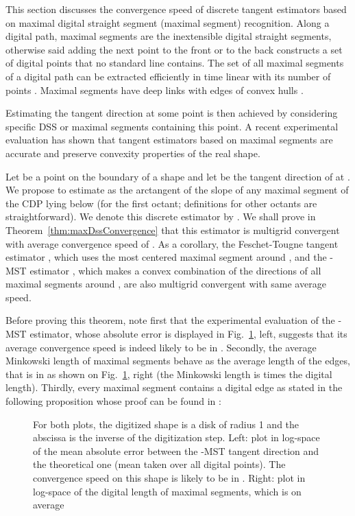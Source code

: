 \documentclass{llncs}
\newcommand{\refFigure}[1]{Fig.~\ref{#1}}
\newcommand{\refTheorem}[1]{Theorem~\ref{#1}}
\begin{document}
This section discusses the convergence speed of discrete tangent
estimators based on maximal digital straight segment (maximal segment)
recognition. Along a digital path, maximal segments are the
inextensible digital straight segments, otherwise said adding the next
point to the front or to the back constructs a set of digital points
that no standard line contains. The set of all maximal segments of a
digital path can be extracted efficiently in time linear with its
number of points \cite{Feschet99}. Maximal segments have deep links
with edges of convex hulls \cite{deVieilleville05a,Doerksen04}. 

Estimating the tangent direction at some point is then achieved by
considering specific DSS \cite{Vialard96} or maximal segments
\cite{Feschet99} containing this point. A recent
experimental evaluation \cite{Lachaud05a} has shown that tangent
estimators based on maximal segments are accurate and preserve
convexity properties of the real shape. 

Let  be a point on the boundary of a shape  and let
 be the tangent direction of  at . We
propose to estimate  as the arctangent of the slope of
any maximal segment of the CDP  lying below  (for the
first octant; definitions for other octants are straightforward). We
denote this discrete estimator by . We shall prove in
\refTheorem{thm:maxDssConvergence} that this estimator is multigrid
convergent with average convergence speed of
. As a corollary, the Feschet-Tougne tangent
estimator \cite{Feschet99}, which uses the most centered maximal
segment around , and the -MST estimator \cite{Lachaud05a},
which makes a convex combination of the directions of all maximal
segments around , are also multigrid convergent with same average
speed.

Before proving this theorem, note first that the experimental
evaluation of the -MST estimator, whose absolute error is
displayed in \refFigure{fig:MST-circle-moy-and-MS-moy}, left, suggests
that its average convergence speed is indeed likely to be in
. Secondly, the average Minkowski length of
maximal segments behave as the average length of the edges, that is in
 as shown on
\refFigure{fig:MST-circle-moy-and-MS-moy}, right (the Minkowski length
is  times the digital length). Thirdly, every maximal segment
contains a digital edge as stated in the following proposition whose
proof can be found in \cite{Lachaud06a}:

\begin{figure}[tbp]
  \begin{center}
  \end{center}
  \caption{For both plots, the digitized shape is a disk of radius 1
    and the abscissa is the inverse of the digitization step. Left:
    plot in log-space of the mean absolute error between the -MST
    tangent direction and the theoretical one (mean taken over all
    digital points).  The convergence speed on this shape is likely to
    be in . Right: plot in log-space of the
    digital length of maximal segments, which is on average
     }
  \label{fig:MST-circle-moy-and-MS-moy}
\end{figure}
\end{document}
